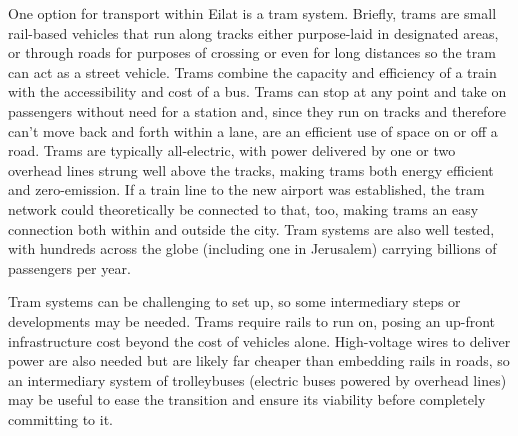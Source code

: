 \documentclass[12pt]{article}                         %
\begin{document}
One option for transport within Eilat is a tram system. Briefly, trams are small rail-based vehicles that run along tracks either purpose-laid in designated areas, or through roads for purposes of crossing or even for long distances so the tram can act as a street vehicle. Trams combine the capacity and efficiency of a train with the accessibility and cost of a bus. Trams can stop at any point and take on passengers without need for a station and, since they run on tracks and therefore can't move back and forth within a lane, are an efficient use of space on or off a road. Trams are typically all-electric, with power delivered by one or two overhead lines strung well above the tracks, making trams both energy efficient and zero-emission. If a train line to the new airport was established, the tram network could theoretically be connected to that, too, making trams an easy connection both within and outside the city. Tram systems are also well tested, with hundreds across the globe (including one in Jerusalem) carrying billions of passengers per year.

Tram systems can be challenging to set up, so some intermediary steps or developments may be needed. Trams require rails to run on, posing an up-front infrastructure cost beyond the cost of vehicles alone. High-voltage wires to deliver power are also needed but are likely far cheaper than embedding rails in roads, so an intermediary system of trolleybuses (electric buses powered by overhead lines) may be useful to ease the transition and ensure its viability before completely committing to it. 
\end{document}
